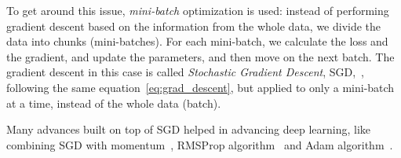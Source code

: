 \par To get around this issue, \textit{mini-batch} optimization is used: instead of performing gradient descent based on the information from the whole data, we divide the data into chunks (mini-batches). For each mini-batch, we calculate the loss and the gradient, and update the parameters, and then move on the next batch. The gradient descent in this case is called \textit{Stochastic Gradient Descent}, SGD,~\citep{robbins1951stochastic}, following the same equation~\ref{eq:grad_descent}, but applied to only a mini-batch at a time, instead of the whole data (batch).

\par Many advances built on top of SGD helped in advancing deep learning, like combining SGD with momentum~\citep{rumelhart1988learning}, RMSProp algorithm~\citep{hinton2012neural} and Adam algorithm~\citep{kingma2014adam}.

%
%
%
%

